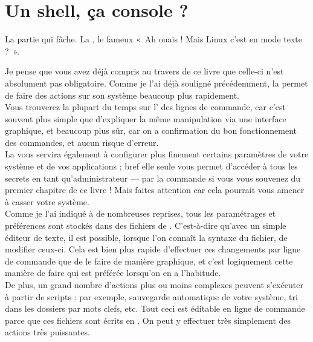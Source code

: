 \section{Un shell, ça console ?}
La partie qui fâche. La , le fameux «~Ah ouais ! Mais Linux c'est en mode texte ?~».\par
Je pense que vous avez déjà compris au travers de ce livre que celle-ci n'est absolument pas obligatoire. Comme je l'ai déjà souligné précédemment, la  permet de faire des actions sur son système beaucoup plus rapidement.\\
Vous trouverez la plupart du temps sur l' des lignes de commande, car c'est souvent plus simple que d'expliquer la même manipulation via une interface graphique, et beaucoup plus sûr, car on a confirmation du bon fonctionnement des commandes, et aucun risque d'erreur.\\
La  vous servira également à configurer plus finement certains paramètres de votre système et de vos applications ; bref elle seule vous permet d'accéder à tous les secrets en tant qu'administrateur --- par la commande  si vous vous souvenez du premier chapitre de ce livre ! Mais faites attention car cela pourrait vous amener à casser votre système.\\
Comme je l'ai indiqué à de nombreuses reprises, tous les paramétrages et préférences sont stockés dans des fichiers de . C'est-à-dire qu'avec un simple éditeur de texte, il est possible, lorsque l'on connaît la syntaxe du fichier, de modifier ceux-ci. Cela est bien plus rapide d'effectuer ces changements par ligne de commande que de le faire de manière graphique, et c'est logiquement cette manière de faire qui est préférée lorsqu'on en a l'habitude.\\
De plus, un grand nombre d'actions plus ou moins complexes peuvent s'exécuter à partir de scripts : par exemple, sauvegarde automatique de votre système, tri dans les dossiers par mots clefs, etc. Tout ceci est éditable en ligne de commande parce que ces fichiers sont écrits en . On peut y effectuer très simplement des actions très puissantes.\par
